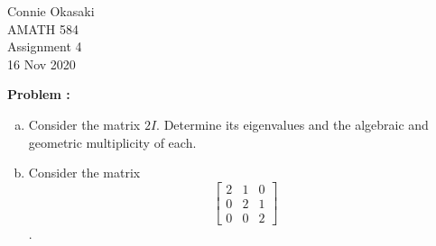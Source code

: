 \documentclass[letter, 12pt]{article}
\begin{document}
\parindent=0in
\newenvironment{problem}[1][]
   {\begin{framed} \textbf{Problem \theprobnum: #1}}
   {\end{framed}\stepcounter{probnum}}
\newenvironment{bookproblem}[1]
   {\begin{framed} \textbf{Problem #1:}}
   {\end{framed}\stepcounter{probnum}}

\begin{flushright}
Connie Okasaki \\
AMATH 584\\
Assignment 4\\
16 Nov 2020
\end{flushright}

\begin{problem}[]
\begin{enumerate}[(a)]
\item Consider the matrix $2I$. Determine its eigenvalues and the algebraic and geometric multiplicity of each.
\item Consider the matrix \[ \begin{bmatrix} 2&1&0\\0&2&1\\0&0&2\end{bmatrix} \].
\end{enumerate}
\end{problem}
\end{document}
